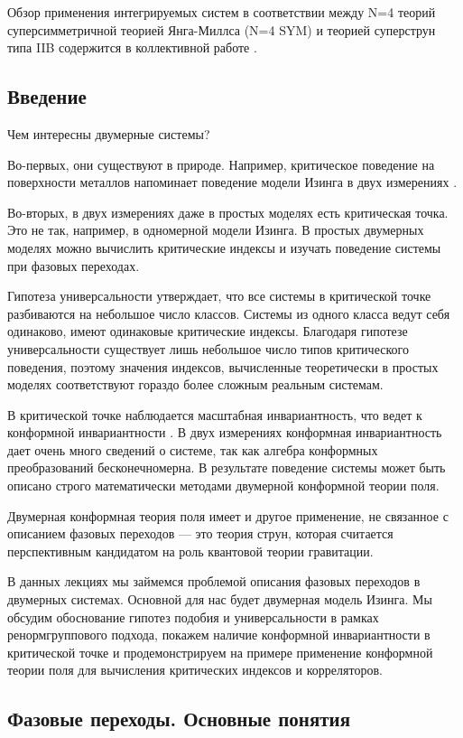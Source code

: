 \documentclass[a4paper,12pt]{article}
\theoremstyle{definition}
\theoremstyle{definition}
\theoremstyle{definition}
\begin{document}
Обзор применения интегрируемых систем в соответствии между N=4 теорий суперсимметричной теорией
Янга-Миллса (N=4 SYM) и теорией суперструн типа IIB содержится в коллективной работе \cite{ReviewAdSCFT}.

\subsection{Введение}
\label{sec:intro}
Чем интересны двумерные системы?

Во-первых, они существуют в природе. Например, критическое поведение на поверхности металлов
напоминает поведение модели Изинга в двух измерениях \cite{campuzano1985110}.

Во-вторых, в двух измерениях даже в простых моделях есть критическая точка. Это не так, например, в
одномерной модели Изинга. В простых двумерных моделях можно вычислить критические индексы и изучать
поведение системы при фазовых переходах.

Гипотеза универсальности утверждает, что все системы в критической точке разбиваются на небольшое
число классов. Системы из одного класса ведут себя одинаково, имеют одинаковые критические индексы.
Благодаря гипотезе универсальности существует лишь небольшое число типов критического поведения,
поэтому значения индексов, вычисленные теоретически в простых моделях соответствуют гораздо более
сложным реальным системам.

В критической точке наблюдается масштабная инвариантность, что ведет к конформной инвариантности
\cite{Polyakov:1970xd}. В двух измерениях конформная инвариантность дает очень много сведений о
системе, так как алгебра конформных преобразований бесконечномерна. В результате поведение системы
может быть описано строго математически методами двумерной конформной теории поля.

Двумерная конформная теория поля имеет и другое применение, не связанное с описанием фазовых
переходов --- это теория струн, которая считается перспективным кандидатом на роль квантовой теории
гравитации.

В данных лекциях мы займемся проблемой описания фазовых переходов в двумерных системах. Основной для
нас будет двумерная модель Изинга. Мы обсудим обоснование гипотез подобия и универсальности в рамках
ренормгруппового подхода, покажем наличие конформной инвариантности в критической точке и
продемонстрируем на примере применение конформной теории поля для вычисления критических индексов и
корреляторов.

\subsection{Фазовые переходы. Основные понятия}
\label{sec:phase-transitions}
\end{document}
